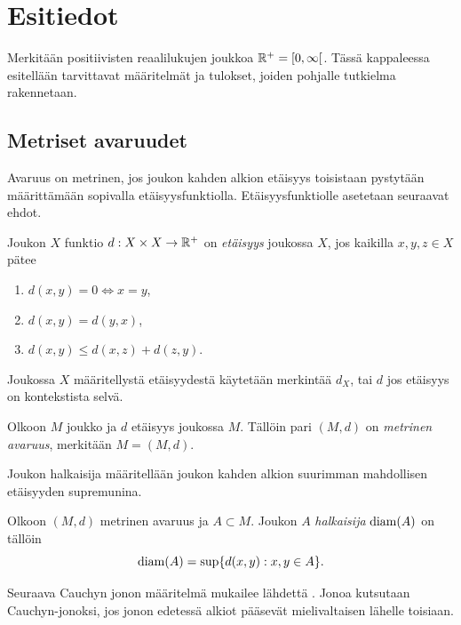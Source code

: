 \documentclass[12pt,oneside,a4paper]{amsbook} %
\begin{document}
\chapter{Esitiedot}
Merkitään positiivisten reaalilukujen joukkoa ${\mathbb{R}^{+}} = [0, \infty[$. Tässä kappaleessa esitellään tarvittavat määritelmät ja tulokset, joiden pohjalle tutkielma rakennetaan. 
\section{Metriset avaruudet}

Avaruus on metrinen, jos joukon kahden alkion etäisyys toisistaan pystytään määrittämään sopivalla etäisyysfunktiolla. Etäisyysfunktiolle asetetaan seuraavat ehdot.

\begin{definition}
    Joukon $X$ funktio $d: X\times X \to \mathbb{R}^+$ on \textit{etäisyys} joukossa $X$, jos kaikilla $x, y, z \in X$ pätee
    \begin{enumerate}
        \item $d(x,y) = 0 \iff x = y$,
        \item $d(x,y) = d(y,x)$,
        \item $d(x,y) \le d(x,z) + d(z,y)$.
    \end{enumerate}
    Joukossa $X$ määritellystä etäisyydestä käytetään merkintää $d_X$, tai $d$ jos etäisyys on kontekstista selvä. 
\end{definition}



\begin{definition}
    Olkoon $M$ joukko ja $d$ etäisyys joukossa $M$. Tällöin pari $(M, d)$ on \textit{metrinen avaruus}, merkitään $M = (M, d)$.
\end{definition}

Joukon halkaisija määritellään joukon kahden alkion suurimman mahdollisen etäisyyden supremunina.
\begin{definition}
    Olkoon $(M, d)$ metrinen avaruus ja $A \subset M$. Joukon $A$ \textit{halkaisija} $\operatorname{diam}(A)$ on
    tällöin
    \begin{equation*}
        \operatorname{diam}(A) = \sup\{d(x, y) : x,y \in A\}.
    \end{equation*}
\end{definition}
Seuraava Cauchyn jonon määritelmä mukailee lähdettä  \cite[s. 52]{rudin}. Jonoa kutsutaan Cauchyn-jonoksi, jos jonon edetessä alkiot pääsevät mielivaltaisen lähelle toisiaan.
\end{document}
